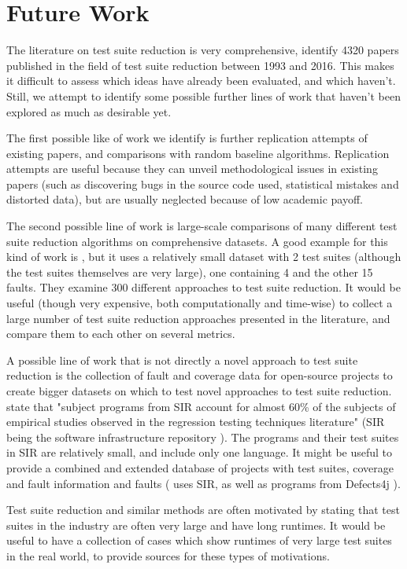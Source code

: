 
\chapter{Future Work}\label{chapter:futurework}

The literature on test suite reduction is very comprehensive,
\cite{khan2018systematic} identify 4320 papers published in the field
of test suite reduction between 1993 and 2016. This makes it difficult
to assess which ideas have already been evaluated, and which haven't.
Still, we attempt to identify some possible further lines of work that
haven't been explored as much as desirable yet.

The first possible like of work we identify is further replication
attempts of existing papers, and comparisons with random baseline
algorithms.  Replication attempts are useful because they can unveil
methodological issues in existing papers (such as discovering bugs in
the source code used, statistical mistakes and distorted data), but are
usually neglected because of low academic payoff. %

The second possible line of work is large-scale comparisons of many
different test suite reduction algorithms on comprehensive datasets.
A good example for this kind of work is \cite{hemmati2010achieving},
but it uses a relatively small dataset with 2 test suites (although
the test suites themselves are very large), one containing 4 and
the other 15 faults. They examine 300 different approaches to test
suite reduction. It would be useful (though very expensive, both
computationally and time-wise) to collect a large number of test suite
reduction approaches presented in the literature, and compare them to
each other on several metrics.

A possible line of work that is not directly a novel approach to
test suite reduction is the collection of fault and coverage data for
open-source projects to create bigger datasets on which to test novel
approaches to test suite reduction. \cite{yoo2012regression}
state that "subject programs from SIR account for almost 60\% of
the subjects of empirical studies observed in the regression testing
techniques literature" (SIR being the software infrastructure repository
\cite{dosupporting2005}). The programs and their test suites in SIR are
relatively small, and include only one language. It might be useful to
provide a combined and extended database of projects with test suites,
coverage and fault information and faults (\cite{cruciani2019scalable}
uses SIR, as well as programs from Defects4j \cite{just2014defects}).

Test suite reduction and similar methods are often motivated by stating
that test suites in the industry are often very large and have long
runtimes. It would be useful to have a collection of cases which show
runtimes of very large test suites in the real world, to provide sources
for these types of motivations.
